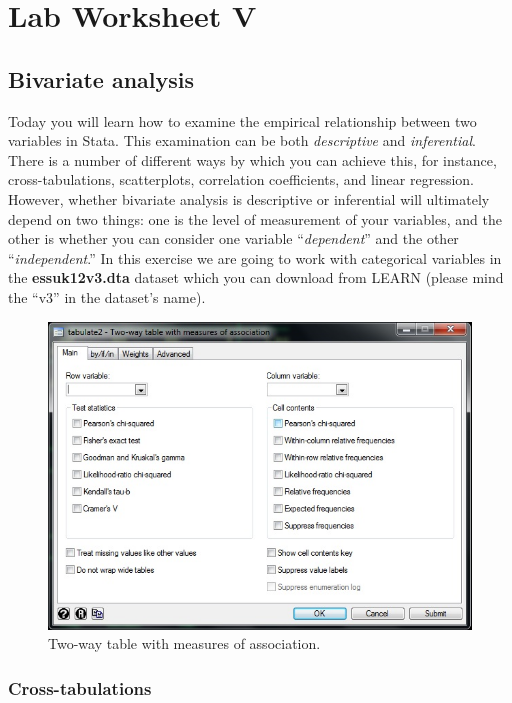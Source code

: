 \section{\hfil Lab Worksheet V \hfil}
\subsection*{Bivariate analysis}

Today you will learn how to examine the empirical relationship between two variables in Stata. This examination can be both \textit{descriptive} and \textit{inferential}. There is a number of different ways by which you can achieve this, for instance, cross-tabulations, scatterplots, correlation coefficients, and linear regression. However, whether bivariate analysis is descriptive or inferential will ultimately depend on two things: one is the level of measurement of your variables, and the other is whether you can consider one variable ``\textit{dependent}'' and the other ``\textit{independent}.'' In this exercise we are going to work with categorical variables in the \textbf{essuk12v3.dta} dataset which you can download from LEARN (please mind the ``v3'' in the dataset's name).

\begin{figure}[H]
	\includegraphics[width=\linewidth]{./img/tabulate2.jpg}
	\caption{Two-way table with measures of association.}
\end{figure}

\subsubsection*{Cross-tabulations}

